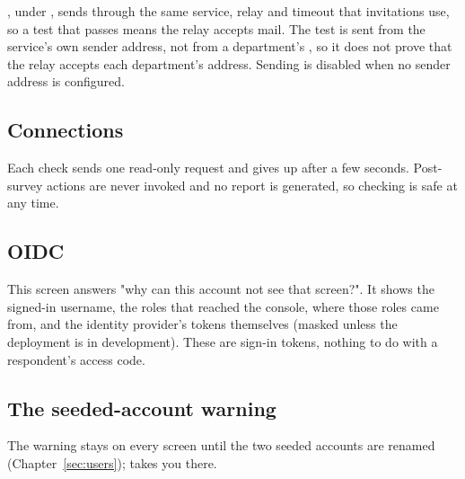 \documentclass[11pt, a4paper]{article}
\begin{document}

, under , sends through the same service, relay and timeout that invitations use,
so a test that passes means the relay accepts mail. The test is sent from the service's own sender
address, not from a department's , so it does not prove that the relay accepts each
department's address. Sending is disabled when no sender address is configured.

\subsection{Connections}


Each check sends one read-only request and gives up after a few seconds. Post-survey actions are
never invoked and no report is generated, so checking is safe at any time.

\subsection{OIDC}


This screen answers "why can this account not see that screen?". It shows the signed-in username,
the roles that reached the console, where those roles came from, and the identity provider's
tokens themselves (masked unless the deployment is in development). These are sign-in tokens,
nothing to do with a respondent's access code.

\subsection{The seeded-account warning}


The warning stays on every screen until the two seeded accounts are renamed
(Chapter~\ref{sec:users});  takes you there.

\end{document}
